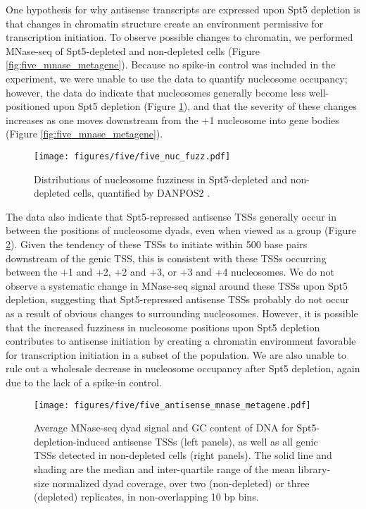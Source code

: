 One hypothesis for why antisense transcripts are expressed upon Spt5 depletion is that changes in chromatin structure create an environment permissive for transcription initiation.
To observe possible changes to chromatin, we performed MNase-seq of Spt5-depleted and non-depleted cells (Figure \ref{fig:five_mnase_metagene}).
Because no spike-in control was included in the experiment, we were unable to use the data to quantify nucleosome occupancy; however, the data do indicate that nucleosomes generally become less well-positioned upon Spt5 depletion (Figure \ref{fig:five_nuc_fuzz}), and that the severity of these changes increases as one moves downstream from the +1 nucleosome into gene bodies (Figure \ref{fig:five_mnase_metagene}).

\begin{figure}[h]
    \centering
    \texttt{[image: figures/five/five\_nuc\_fuzz.pdf]}
    \caption[Distributions of nucleosome fuzziness in Spt5-depleted and non-depleted cells.]{Distributions of nucleosome fuzziness in Spt5-depleted and non-depleted cells, quantified by DANPOS2 \citep{chen2013}.}
    \label{fig:five_nuc_fuzz}
\end{figure}

The data also indicate that Spt5-repressed antisense TSSs generally occur in between the positions of nucleosome dyads, even when viewed as a group (Figure \ref{fig:five_antisense_mnase_metagene}).
Given the tendency of these TSSs to initiate within 500 base pairs downstream of the genic TSS, this is consistent with these TSSs occurring between the +1 and +2, +2 and +3, or +3 and +4 nucleosomes.
We do not observe a systematic change in MNase-seq signal around these TSSs upon Spt5 depletion, suggesting that Spt5-repressed antisense TSSs probably do not occur as a result of obvious changes to surrounding nucleosomes.
However, it is possible that the increased fuzziness in nucleosome positions upon Spt5 depletion contributes to antisense initiation by creating a chromatin environment favorable for transcription initiation in a subset of the population.
We are also unable to rule out a wholesale decrease in nucleosome occupancy after Spt5 depletion, again due to the lack of a spike-in control.
\begin{figure}[h]
    \texttt{[image: figures/five/five\_antisense\_mnase\_metagene.pdf]}
    \caption[Average MNase-seq dyad signal and GC content in Spt5-depleted and non-depleted cells, flanking all antisense TSSs upregulated in Spt5-depleted cells, as well as all genic TSSs detected in non-depleted cells.]{Average MNase-seq dyad signal and GC content of DNA for Spt5-depletion-induced antisense TSSs (left panels), as well as all genic TSSs detected in non-depleted cells (right panels). The solid line and shading are the median and inter-quartile range of the mean library-size normalized dyad coverage, over two (non-depleted) or three (depleted) replicates, in non-overlapping 10 bp bins.
}
    \label{fig:five_antisense_mnase_metagene}
\end{figure}


